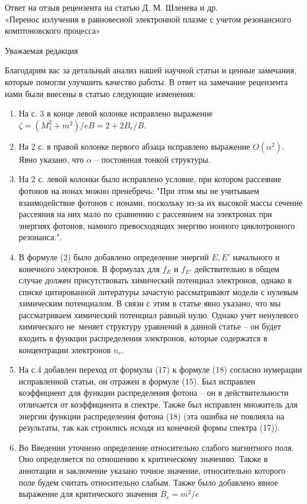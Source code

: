 \documentclass[14pt, russian]{article}
\begin{document}
\begin{center}
Ответ на отзыв рецензента на статью Д. М. Шленева и др.\\
«Перенос излучения в равновесной электронной плазме
с учетом резонансного комптоновского процесса»

\vspace{5mm}
Уважаемая редакция
\end{center}

Благодарим вас за детальный анализ нашей научной статьи и ценные замечания, которые помогли улучшить качество работы.
В ответ на замечание рецензента нами были внесены в статью следующие изменения:
\begin{enumerate}
	\item На с. 3 в конце левой колонке исправлено выражение $\zeta=(M_1^2+m^2)/eB=2+2B_e/B$.
	\item На 2 с. в правой колонке первого абзаца исправлено выражение $O(\alpha^2)$. Явно указано, что $\alpha$ -- постоянная тонкой структуры.
	\item На 2 с. левой колонки было исправлено условие, при котором рассеяние фотонов на ионах можно пренебречь: "При этом мы не учитываем взаимодействие фотонов с ионами, поскольку из-за их высокой массы сечение рассеяния на них мало по сравнению с рассеянием на электронах при энергиях фотонов, намного превосходящих энергию ионного циклотронного резонанса.".
	\item В формуле (2) было добавлено определение энергий $E, E'$ начального и конечного электронов. В формулах для $f_E$ и $f_{E'}$ действительно в общем случае должен присутствовать химический потенциал электронов, однако в списке цитированной литературы зачастую рассматривают модели с нулевым химическим потенциалом. В связи с этим в статье явно указано, что мы рассматриваем химический потенциал равный нулю.
	Однако учет ненулевого химического не~меняет структуру уравнений в данной статье -- он будет входить в функции распределения электронов, которые содержатся в концентрации электронов $n_e$.
	\item На с.4 добавлен переход от формулы (17) к формуле (18) согласно нумерации исправленной статьи, он отражен в формуле (15). Был исправлен коэффициент для функции распределения фотона -- он в действительности отличается от коэффициента в спектре. Также был исправлен множитель для энергии функции распределения фотона (18) (эта ошибка не повлияла на результаты, так как строились исходя из конечной формы спектра (17)).
	\item Во Введении уточнено определение относительно слабого магнитного поля. Оно определяется по отношению к критическому значению. Также в аннотации и заключение указано точное значение, относительно которого поле будем считать относительно слабым. Также было добавлено явное выражение для критического значения $B_e = m^2/e$

\end{enumerate}
\end{document}
